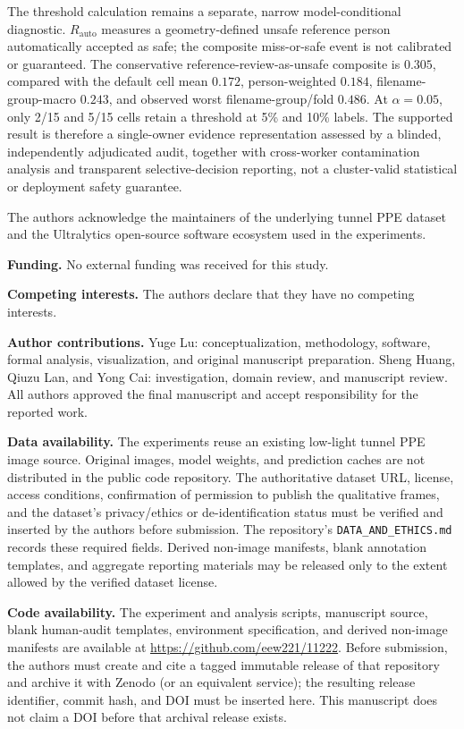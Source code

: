 \documentclass[iicol,pdflatex,sn-mathphys-num]{sn-jnl}
\begin{document}
The threshold calculation remains a separate, narrow model-conditional diagnostic. $R_{\mathrm{auto}}$ measures a geometry-defined unsafe reference person automatically accepted as safe; the composite miss-or-safe event is not calibrated or guaranteed. The conservative reference-review-as-unsafe composite is $0.305$, compared with the default cell mean $0.172$, person-weighted $0.184$, filename-group-macro $0.243$, and observed worst filename-group/fold $0.486$. At $\alpha=0.05$, only 2/15 and 5/15 cells retain a threshold at 5\% and 10\% labels. The supported result is therefore a single-owner evidence representation assessed by a blinded, independently adjudicated audit, together with cross-worker contamination analysis and transparent selective-decision reporting, not a cluster-valid statistical or deployment safety guarantee.

\backmatter

The authors acknowledge the maintainers of the underlying tunnel PPE dataset and the Ultralytics open-source software ecosystem used in the experiments.


\textbf{Funding.} No external funding was received for this study.

\textbf{Competing interests.} The authors declare that they have no competing interests.

\textbf{Author contributions.} Yuge Lu: conceptualization, methodology, software, formal analysis, visualization, and original manuscript preparation. Sheng Huang, Qiuzu Lan, and Yong Cai: investigation, domain review, and manuscript review. All authors approved the final manuscript and accept responsibility for the reported work.

\textbf{Data availability.} The experiments reuse an existing low-light tunnel PPE image source. Original images, model weights, and prediction caches are not distributed in the public code repository. The authoritative dataset URL, license, access conditions, confirmation of permission to publish the qualitative frames, and the dataset's privacy/ethics or de-identification status must be verified and inserted by the authors before submission. The repository's \texttt{DATA\_AND\_ETHICS.md} records these required fields. Derived non-image manifests, blank annotation templates, and aggregate reporting materials may be released only to the extent allowed by the verified dataset license.

\textbf{Code availability.} The experiment and analysis scripts, manuscript source, blank human-audit templates, environment specification, and derived non-image manifests are available at \url{https://github.com/eew221/11222}. Before submission, the authors must create and cite a tagged immutable release of that repository and archive it with Zenodo (or an equivalent service); the resulting release identifier, commit hash, and DOI must be inserted here. This manuscript does not claim a DOI before that archival release exists.
\end{document}
